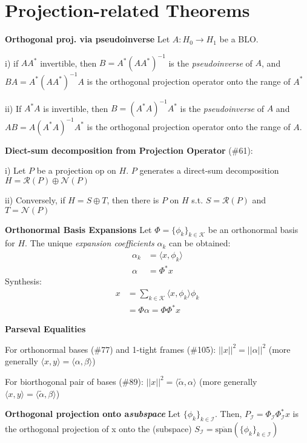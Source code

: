 \documentclass{article}
\newcommand{\la}{\langle}
\newcommand{\ra}{\rangle}
\begin{document}
\section{Projection-related Theorems}
\label{pseudoinv}
\textbf{Orthogonal proj. via pseudoinverse} Let $A: H_0 \rightarrow H_1$ be a BLO.

i) if $AA^{*}$ invertible, then $B=A^{*}(AA^{*})^{-1}$ is the \textit{pseudoinverse} of $A$, and $BA=A^{*}(AA^{*})^{-1}A$ is the orthogonal projection operator onto the range of $A^{*}$

ii) If $A^{*}A$ is invertible, then $B=(A^{*}A)^{-1}A^{*}$ is the \textit{pseudoinverse} of $A$ and $AB=A(A^{*}A)^{-1}A^{*}$  is the orthogonal projection operator onto the range of $A$.

\textbf{Diect-sum decomposition from Projection Operator} (\#61):

i) Let $P$ be a projection op on $H$. $P$ generates a direct-sum decomposition $H=\mathcal{R}(P)\oplus\mathcal{N}(P)$

ii) Conversely, if $H=S\oplus T$, then there is $P$ on $H$ s.t. $S=\mathcal{R}(P)$ and $T=\mathcal{N}(P)$

\textbf{Orthonormal Basis Expansions} Let $\Phi=\{\phi_k\}_{k\in\mathcal{K}}$ be an orthonormal basis for $H$. The unique \textit{expansion coefficients} $\alpha_k$ can be obtained: 
\begin{eqnarray}
\alpha_k &= \la x, \phi_k \ra \\
\alpha &= \Phi^{*} x
\end{eqnarray}
Synthesis:
\begin{eqnarray}
x &= \sum_{k\in\mathcal{K}}\la x, \phi_k\ra \phi_k \\
&= \Phi\alpha = \Phi\Phi^{*}x
\end{eqnarray}


\textbf{Parseval Equalities} 

For orthonormal bases (\#77) and 1-tight frames (\#105): $||x||^2=||\alpha||^2$ (more generally $\la x,y \ra = \la \alpha, \beta \ra$)

For biorthogonal pair of bases (\#89): $||x||^2=\la \tilde{\alpha}, \alpha\ra$ (more generally $\la x,y \ra = \la \tilde{\alpha}, \beta \ra$)

\textbf{Orthogonal projection onto a\textit{subspace}}
Let $\{\phi_k\}_{k\in\mathcal{I}}$. Then, $P_{\mathcal{I}}=\Phi_{\mathcal{I}}\Phi_{\mathcal{I}}^{*}x$ is the orthogonal projection of x onto the (subspace) $S_{\mathcal{I}}=\overline{\mbox{span}}(\{\phi_k\}_{k\in\mathcal{I}})$
\end{document}
